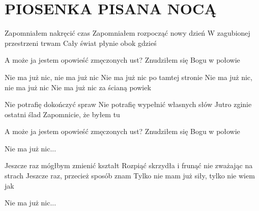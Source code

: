 \documentclass[../../../songbook.tex]{subfiles}
\begin{document}
\TabPositions{8cm} %
\section*{PIOSENKA PISANA NOCĄ}
{}
\vspace{0.5cm}
Zapomniałem nakręcić czas			 \newline
Zapomniałem rozpocząć nowy dzień	 \newline
W zagubionej przestrzeni trwam \newline
Cały świat płynie obok gdzieś \newline

A może ja jestem opowieść zmęczonych ust?	 \newline
Znudziłem się Bogu w połowie				 \newline

\-\hspace{1cm} Nie ma już nic, nie ma już nic		 \newline
\-\hspace{1cm} Nie ma już nic po tamtej stronie		 \newline
\-\hspace{1cm} Nie ma już nic, nie ma już nic \newline
\-\hspace{1cm} Nie ma już nic za ścianą powiek \newline

Nie potrafię dokończyć spraw \newline
Nie potrafię wypełnić własnych słów \newline
Jutro zginie ostatni ślad \newline
Zapomnicie, że byłem tu \newline

A może ja jestem opowieść zmęczonych ust? \newline
Znudziłem się Bogu w połowie \newline

\-\hspace{1cm} Nie ma już nic... \newline

Jeszcze raz mógłbym zmienić kształt					 \newline
Rozpiąć skrzydła i frunąć nie zważając na strach	 \newline
Jeszcze raz, przecież sposób znam					 \newline
Tylko nie mam już siły, tylko nie wiem jak			 \newline
	
\-\hspace{1cm} Nie ma już nic... \newline
\end{document}
